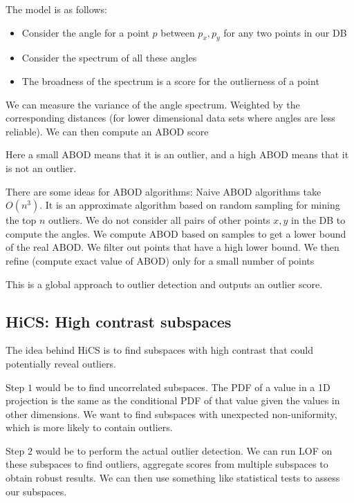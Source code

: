     The model is as follows:
    \begin{itemize}
        \item Consider the angle for a point $p$ between $p_x, p_y$ for any two points in our DB
        \item Consider the spectrum of all these angles
        \item The broadness of the spectrum is a score for the outlierness of a point
    \end{itemize}
    
    We can measure the variance of the angle spectrum. Weighted by the corresponding distances (for lower dimensional data sets where angles are less reliable). We can then compute an ABOD score
    
    Here a small ABOD means that it is an outlier, and a high ABOD means that it is not an outlier. 
    
    There are some ideas for ABOD algorithms: Naive ABOD algorithms take $O(n^3)$. It is an approximate algorithm based on random sampling for mining the top $n$ outliers. We do not consider all pairs of other points $x, y$ in the DB to compute the angles. We compute ABOD based on samples to get a lower bound of the real ABOD. We filter out points that have a high lower bound. We then refine (compute exact value of ABOD) only for a small number of points
    
    This is a global approach to outlier detection and outputs an outlier score.
    
    
\subsection{HiCS: High contrast subspaces}
    The idea behind HiCS is to find subspaces with high contrast that could potentially reveal outliers. 
    
    Step $1$ would be to find uncorrelated subspaces. The PDF of a value in a 1D projection is the same as the conditional PDF of that value given the values in other dimensions. We want to find subspaces with unexpected non-uniformity, which is more likely to contain outliers. 
    
    Step $2$ would be to perform the actual outlier detection. We can run LOF on these subspaces to find outliers, aggregate scores from multiple subspaces to obtain robust results. We can then use something like statistical tests to assess our subspaces.
    
